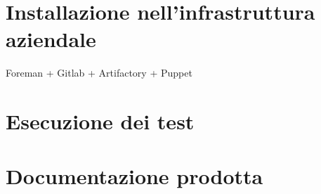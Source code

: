 \section{Installazione nell'infrastruttura aziendale}
Foreman + Gitlab + Artifactory + Puppet
\label{sec:progettazione-test}

\section{Esecuzione dei test}
\label{sec:esecuzione-test}

\section{Documentazione prodotta}
\label{sec:documentazione}
